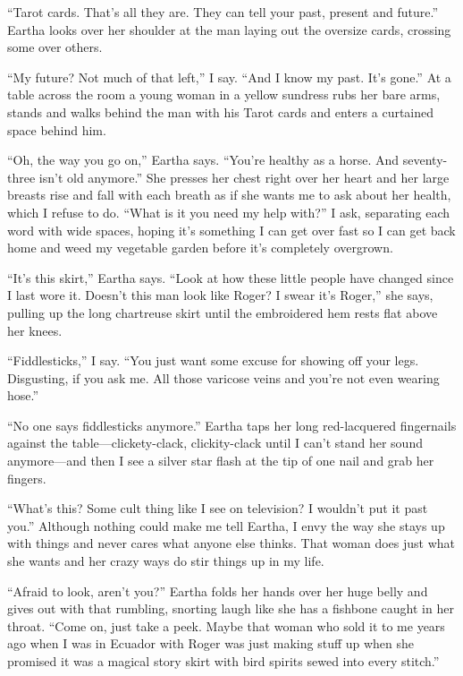 \documentclass[
]{article}
\begin{document}
``Tarot cards. That's all they are. They can tell your past, present and
future.'' Eartha looks over her shoulder at the man laying out the
oversize cards, crossing some over others.

``My future? Not much of that left,'' I say. ``And I know my past. It's
gone.'' At a table across the room a young woman in a yellow sundress
rubs her bare arms, stands and walks behind the man with his Tarot cards
and enters a curtained space behind him.

``Oh, the way you go on,'' Eartha says. ``You're healthy as a horse. And
seventy-three isn't old anymore.'' She presses her chest right over her
heart and her large breasts rise and fall with each breath as if she
wants me to ask about her health, which I refuse to do. ``What is it you
need my help with?'' I ask, separating each word with wide spaces,
hoping it's something I can get over fast so I can get back home and
weed my vegetable garden before it's completely overgrown.

``It's this skirt,'' Eartha says. ``Look at how these little people have
changed since I last wore it. Doesn't this man look like Roger? I swear
it's Roger,'' she says, pulling up the long chartreuse skirt until the
embroidered hem rests flat above her knees.

``Fiddlesticks,'' I say. ``You just want some excuse for showing off
your legs. Disgusting, if you ask me. All those varicose veins and
you're not even wearing hose.''

``No one says fiddlesticks anymore.'' Eartha taps her long red-lacquered
fingernails against the table---clickety-clack, clickity-clack until I
can't stand her sound anymore---and then I see a silver star flash at
the tip of one nail and grab her fingers.

``What's this? Some cult thing like I see on television? I wouldn't put
it past you.'' Although nothing could make me tell Eartha, I envy the
way she stays up with things and never cares what any­one else thinks.
That woman does just what she wants and her crazy ways do stir things up
in my life.

``Afraid to look, aren't you?'' Eartha folds her hands over her huge
belly and gives out with that rumbling, snorting laugh like she has a
fishbone caught in her throat. ``Come on, just take a peek. Maybe that
woman who sold it to me years ago when I was in Ecuador with Roger was
just making stuff up when she promised it was a magical story skirt with
bird spirits sewed into every stitch.''
\end{document}
